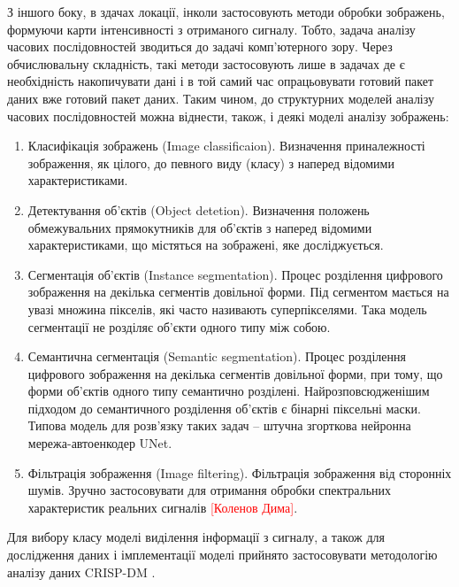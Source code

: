 З іншого боку, в здачах локації, інколи застосовують методи обробки 
зображень, формуючи карти інтенсивності з отриманого сигналу. Тобто,
задача аналізу часових послідовностей зводиться до задачі комп'ютерного зору. 
Через обчислювальну складність, такі методи застосовують лише в задачах де є 
необхідність накопичувати дані і в той самий час опрацьовувати готовий пакет 
даних вже готовий пакет даних. Таким чином, до структурних моделей 
аналізу часових послідовностей можна віднести, також, і деякі моделі 
аналізу зображень:

\begin{enumerate}

	\item Класифікація зображень (Image classificaion). Визначення 
	приналежності зображення, як цілого, до певного виду (класу) з наперед 
	відомими характеристиками.

	\item Детектування об'єктів (Object detetion). Визначення положень 
	обмежувальних прямокутників для об'єктів з наперед відомими 
	характеристиками, що містяться на зображені, яке досліджується.

	\item Сегментація об'єктів (Instance segmentation). Процес розділення 
	цифрового зображення на декілька сегментів довільної форми. Під сегментом 
	мається на увазі множина пікселів, які часто називають суперпікселями. 
	Така модель сегментації не розділяє об'єкти одного типу між собою.

	\item Семантична сегментація (Semantic segmentation). Процес розділення 
	цифрового зображення на декілька сегментів довільної форми, при тому, що
	форми об'єктів одного типу семантично розділені. Найрозповсюдженішим 
	підходом до семантичного розділення об'єктів є бінарні піксельні маски. 
	Типова модель для розв'язку таких задач -- штучна згорткова нейронна 
	мережа-автоенкодер UNet.

	\item Фільтрація зображення (Image filtering). Фільтрація зображення 
	від сторонніх шумів. Зручно застосовувати для отримання обробки 
	спектральних характеристик реальних сигналів 
	\textcolor{red}{[Коленов Дима]}.

\end{enumerate}

Для вибору класу моделі виділення інформації з сигналу, а також для 
дослідження даних і імплементації моделі прийнято застосовувати  
методологію аналізу даних CRISP-DM \cite{imp:CRISPDM2000}.


